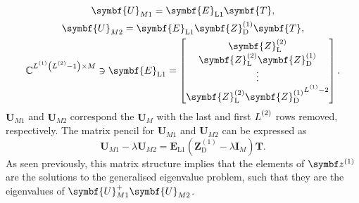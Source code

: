 \begin{subequations}
    \begin{gather}
        \symbf{U}_{M1} = \symbf{E}^{\vphantom{(1)}}_{\text{L}1} \symbf{T},\\
        \symbf{U}_{M2} = \symbf{E}^{\vphantom{(1)}}_{\text{L}1} \symbf{Z}^{(1)}_{\text{D}} \symbf{T},\\
        \mathbb{C}^{\Lone \left(\Ltwo - 1\right) \times M} \ni
        \symbf{E}_{\text{L}1} =
        \begin{bmatrix}
            \symbf{Z}^{(2)}_{\text{L}} \\
            \symbf{Z}^{(2)}_{\text{L}} \symbf{Z}^{(1)}_{\text{D}} \\
            \vdots \\
            \symbf{Z}^{(2)}_{\text{L}} {\symbf{Z}^{(1)}_{\text{D}}}^{\Lone - 2}
        \end{bmatrix}.
    \end{gather}
\end{subequations}
$\symbf{U}_{M1}$ and $\symbf{U}_{M2}$ correspond the $\symbf{U}_M$ with the
last and first $\Ltwo$ rows removed, respectively. The matrix pencil for
$\symbf{U}_{M1}$ and $\symbf{U}_{M2}$ can be expressed as
\begin{equation}
    \symbf{U}_{M1} - \lambda \symbf{U}_{M2} =
    \symbf{E}_{\text{L}1} \left( \symbf{Z}^{(1)}_{\text{D}} - \lambda \symbf{I}_M \right) \symbf{T}.
\end{equation}
As seen previously, this matrix structure implies that the elements of
$\bdzone$ are the solutions to the generalised eigenvalue problem, such that
they are the eigenvalues of $\symbf{U}_{M1}^{+} \symbf{U}_{M2}^{\vphantom{+}}$.


